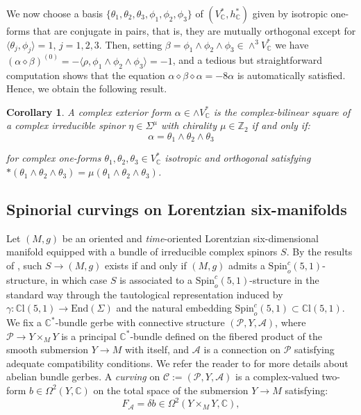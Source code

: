\documentclass[10pt,a4paper,twoside,reqno]{amsart}
\theoremstyle{plain}
\newtheorem{cor}[thm]{Corollary}
\theoremstyle{definition}
\theoremstyle{remark}
\newcommand{\End}{\mathrm{End}}
\def\C{\mathbb{C}}
\def\cC{{\mathcal C}}
\def\Spin{\mathrm{Spin}}
\def\Spin{\mathrm{Spin}}
\def\cA{\mathcal{A}}
\def\cP{\mathcal{P}}
\def\cP{\mathcal{P}}
\def\cC{\mathcal{C}}
\newcommand{\escal}[1]{\langle#1\rangle}
\begin{document}
We now choose a basis $\{\theta_1,\theta_2,\theta_3,\phi_1,\phi_2,\phi_3\}$ of $(V^*_\C,h^*_\C)$ given by isotropic one-forms that are conjugate in pairs, that is, they are mutually orthogonal except for $\escal{\theta_j,\phi_j}=1$, $j=1,2,3$. Then, setting $\beta=\phi_1\wedge\phi_2\wedge\phi_3\in\wedge^3V^*_\C$ we have $(\alpha\diamond\beta)^{(0)}=-\escal{\rho,\phi_1\wedge\phi_2\wedge\phi_3}=-1$, and a tedious but straightforward computation shows that the equation $\alpha\diamond\beta\diamond\alpha=-8\alpha$ is automatically satisfied. Hence, we obtain the following result.

\begin{cor}
A complex exterior form $\alpha\in\wedge V^*_\C$ is the complex-bilinear square of a complex irreducible spinor $\eta\in\Sigma^\mu$ with chirality $\mu \in \mathbb{Z}_2$ if and only if: 
\begin{equation*}
\alpha=\theta_1\wedge\theta_2\wedge\theta_3    
\end{equation*}

\noindent
for complex one-forms $\theta_1,\theta_2,\theta_3\in V^*_\C$ isotropic and orthogonal satisfying $\ast (\theta_1\wedge\theta_2\wedge\theta_3) = \mu(\theta_1\wedge\theta_2\wedge\theta_3)$.
\end{cor}


\subsection{Spinorial curvings on Lorentzian six-manifolds}


Let $(M,g)$ be an oriented and \emph{time}-oriented Lorentzian six-dimensional manifold equipped with a bundle of irreducible complex spinors $S$. By the results of \cite{LS18,LS19,LS22_complex_type}, such $S \to (M,g)$ exists if and only if $(M,g)$ admits a $\Spin_o^c(5,1)$-structure, in which case $S$ is associated to a $\Spin_o^c(5,1)$-structure in the standard way through the tautological representation induced by $\gamma\colon\C\mathrm{l}(5,1)\to\End(\Sigma)$ and the natural embedding $\Spin_o^c(5,1)\subset\C\mathrm{l}(5,1)$. We fix a $\mathbb{C}^{\ast}$-bundle gerbe with connective structure $(\cP, Y, \cA)$, where $\cP\to Y\times_M Y$ is a principal $\mathbb{C}^{\ast}$-bundle defined on the fibered product of the smooth submersion $Y\to M$ with itself, and $\cA$ is a connection on $\cP$ satisfying adequate compatibility conditions. We refer the reader to \cite{Brylinski1993,Bunk2021,Giraud1971,Murray1996} for more details about abelian bundle gerbes. A \emph{curving} on $\cC := (\cP , Y, \cA)$ is a complex-valued two-form $b\in \Omega^2(Y,\C)$ on the total space of the submersion $Y\to M$ satisfying:
\begin{equation*}
F_{\cA} = \delta b \in \Omega^2( Y \times_M Y,\mathbb{C}),
\end{equation*}
\end{document}
